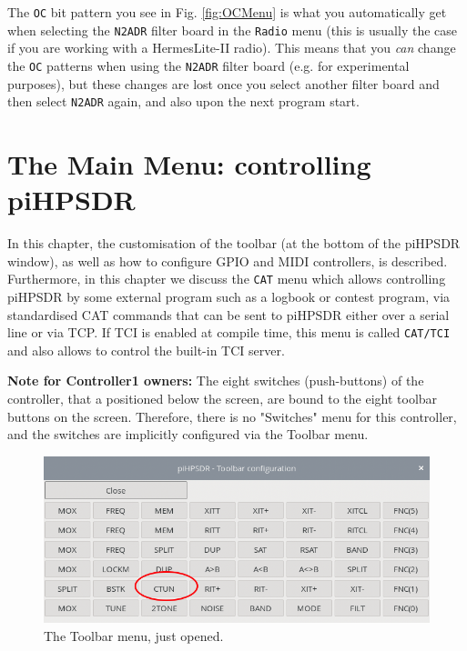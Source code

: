 \documentclass[12pt]{book}
\def\bltt#1{\texttt{\color{blue}#1}}
\def\pH{pi\-HPSDR\xspace}
\begin{document}
The \bltt{OC} bit pattern you see in Fig. \ref{fig:OCMenu} is what you automatically
get when selecting the
\texttt{N2ADR} filter board in the \bltt{Radio} menu
(this is usually the
case if you are working with a HermesLite-II radio). This means that
you \textit{can} change the \bltt{OC} patterns when using the \texttt{N2ADR} filter board
(e.g. for experimental purposes), but
these changes are lost once you select another filter board and then select \texttt{N2ADR} again,
and also upon the next program start.

\chapter[Controlling \pH]{The Main Menu: controlling \pH}

In this chapter, the customisation of the toolbar (at the bottom of the \pH window),
as well as how to configure GPIO and MIDI controllers, is described. Furthermore, in this
chapter we discuss the \bltt{CAT} menu which allows controlling \pH by some external program
such as a logbook or contest program, via standardised CAT commands that can be sent to
\pH either over a serial line or via TCP. If TCI is enabled at compile  time, this menu
is called \bltt{CAT/TCI} and also allows to control the built-in TCI server.

\textbf{Note for Controller1 owners:} The eight switches (push-buttons) of the controller,
that a positioned below the screen, are bound to the eight toolbar buttons on the screen.
Therefore, there is no "Switches" menu for this controller, and the switches are implicitly
configured via the Toolbar menu.

\begin{figure}[ht]
\center
\includegraphics[scale=0.45]{ToolbarMenu1.png}
\caption{The Toolbar menu, just opened.}
\label{fig:ToolbarMenu1}
\end{figure}
\end{document}
